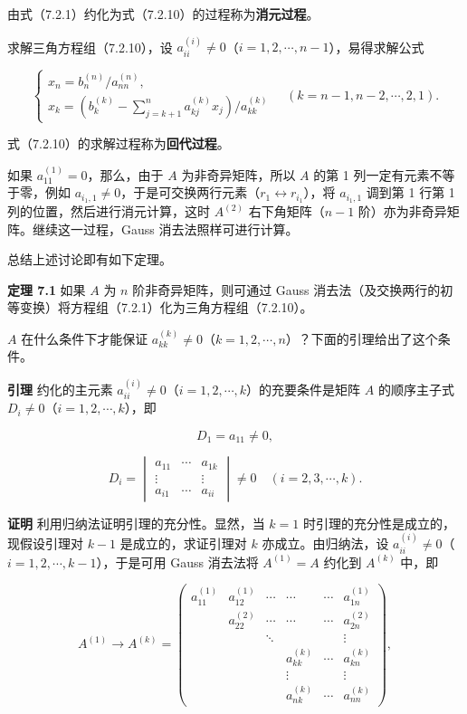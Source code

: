 \documentclass[
  10pt,
  fontset=fandol]{ctexart}
\begin{document}
由式（7.2.1）约化为式（7.2.10）的过程称为\textbf{消元过程}。

求解三角方程组（7.2.10），设 \(a_{ii}^{(i)}\ne0\)（\(i=1,2,\cdots,n-1\)），易得求解公式

\[
\begin{cases}
x_n=b_n^{(n)}/a_{nn}^{(n)},\\
x_k=\displaystyle\left(b_k^{(k)}-\sum_{j=k+1}^{n}a_{kj}^{(k)}x_j\right)/a_{kk}^{(k)}
\end{cases}
\quad(k=n-1,n-2,\cdots,2,1).
\tag{7.2.11}
\]

式（7.2.10）的求解过程称为\textbf{回代过程}。

如果 \(a_{11}^{(1)}=0\)，那么，由于 \(A\) 为非奇异矩阵，所以 \(A\) 的第 1 列一定有元素不等于零，例如 \(a_{i_1,1}\ne0\)，于是可交换两行元素（\(r_1\leftrightarrow r_{i_1}\)），将 \(a_{i_1,1}\) 调到第 1 行第 1 列的位置，然后进行消元计算，这时 \(A^{(2)}\) 右下角矩阵（\(n-1\) 阶）亦为非奇异矩阵。继续这一过程，Gauss 消去法照样可进行计算。

总结上述讨论即有如下定理。

\textbf{定理 7.1} 如果 \(A\) 为 \(n\) 阶非奇异矩阵，则可通过 Gauss 消去法（及交换两行的初等变换）将方程组（7.2.1）化为三角方程组（7.2.10）。

\(A\) 在什么条件下才能保证 \(a_{kk}^{(k)}\ne0\)（\(k=1,2,\cdots,n\)）？下面的引理给出了这个条件。

\textbf{引理} 约化的主元素 \(a_{ii}^{(i)}\ne0\)（\(i=1,2,\cdots,k\)）的充要条件是矩阵 \(A\) 的顺序主子式 \(D_i\ne0\)（\(i=1,2,\cdots,k\)），即

\[D_1=a_{11}\ne0,\]

\[
D_i=\begin{vmatrix}
a_{11}&\cdots&a_{1k}\\
\vdots&&\vdots\\
a_{i1}&\cdots&a_{ii}
\end{vmatrix}\ne0\quad(i=2,3,\cdots,k).
\tag{7.2.12}
\]

\textbf{证明} 利用归纳法证明引理的充分性。显然，当 \(k=1\) 时引理的充分性是成立的，现假设引理对 \(k-1\) 是成立的，求证引理对 \(k\) 亦成立。由归纳法，设 \(a_{ii}^{(i)}\ne0\)（\(i=1,2,\cdots,k-1\)），于是可用 Gauss 消去法将 \(A^{(1)}=A\) 约化到 \(A^{(k)}\) 中，即

\[
A^{(1)}\to A^{(k)}=\begin{pmatrix}
a_{11}^{(1)}&a_{12}^{(1)}&\cdots&\cdots&\cdots&a_{1n}^{(1)}\\
&a_{22}^{(2)}&\cdots&\cdots&\cdots&a_{2n}^{(2)}\\
&&\ddots&&&\vdots\\
&&&a_{kk}^{(k)}&\cdots&a_{kn}^{(k)}\\
&&&\vdots&&\vdots\\
&&&a_{nk}^{(k)}&\cdots&a_{nn}^{(k)}
\end{pmatrix},
\]
\end{document}
